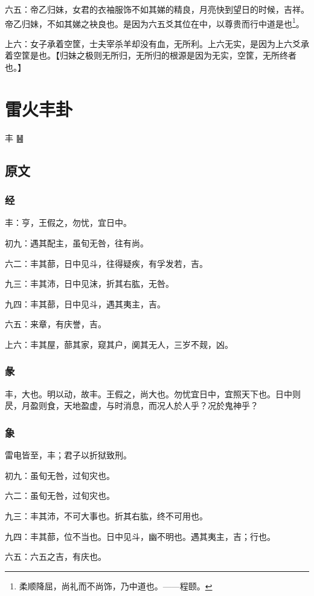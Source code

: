 \documentclass[12pt,oneside]{book}
\begin{document}
六五：帝乙归妹，女君的衣袖服饰不如其娣的精良，月亮快到望日的时候，吉祥。帝乙归妹，不如其娣之袂良也。是因为六五爻其位在中，以尊贵而行中道是也\footnote{柔顺降屈，尚礼而不尚饰，乃中道也。——程颐。}。

上六：女子承着空筐，士夫宰杀羊却没有血，无所利。上六无实，是因为上六爻承着空筐是也。【归妹之极则无所归，无所归的根源是因为无实，空筐，无所终者也。】



\chapter{雷火丰卦}
丰 {\Large ䷶}

\section{原文}

\subsection{经}
丰：亨，王假之，勿忧，宜日中。

初九：遇其配主，虽旬无咎，往有尚。

六二：丰其蔀，日中见斗，往得疑疾，有孚发若，吉。

九三：丰其沛，日中见沫，折其右肱，无咎。

九四：丰其蔀，日中见斗，遇其夷主，吉。

六五：来章，有庆誉，吉。

上六：丰其屋，蔀其家，窥其户，阒其无人，三岁不觌，凶。

\subsection{彖}
丰，大也。明以动，故丰。王假之，尚大也。勿忧宜日中，宜照天下也。日中则昃，月盈则食，天地盈虚，与时消息，而况人於人乎？况於鬼神乎？

\subsection{象}
雷电皆至，丰；君子以折狱致刑。

初九：虽旬无咎，过旬灾也。

六二：虽旬无咎，过旬灾也。

九三：丰其沛，不可大事也。折其右肱，终不可用也。

九四：丰其蔀，位不当也。日中见斗，幽不明也。遇其夷主，吉；行也。

六五：六五之吉，有庆也。
\end{document}
